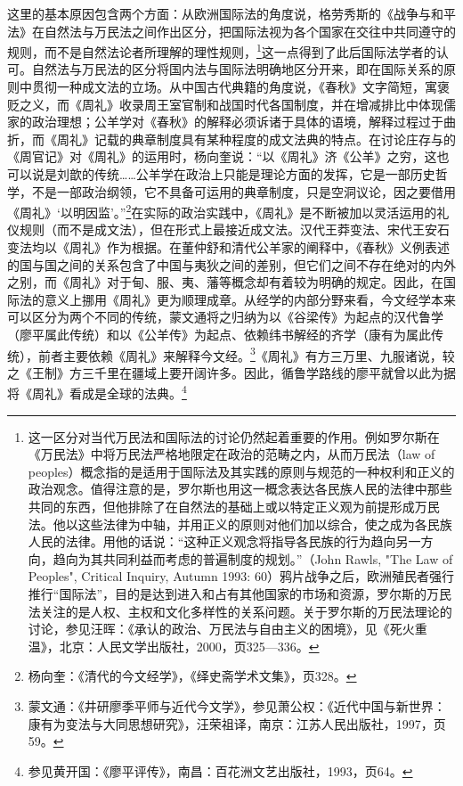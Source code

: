 \documentclass[a4paper, 12pt, openright]{ctexbook}
\begin{document}
这里的基本原因包含两个方面：从欧洲国际法的角度说，格劳秀斯的《战争与和平法》在自然法与万民法之间作出区分，把国际法视为各个国家在交往中共同遵守的规则，而不是自然法论者所理解的理性规则，\footnote{这一区分对当代万民法和国际法的讨论仍然起着重要的作用。例如罗尔斯在《万民法》中将万民法严格地限定在政治的范畴之内，从而万民法（law of peoples）概念指的是适用于国际法及其实践的原则与规范的一种权利和正义的政治观念。值得注意的是，罗尔斯也用这一概念表达各民族人民的法律中那些共同的东西，但他排除了在自然法的基础上或以特定正义观为前提形成万民法。他以这些法律为中轴，并用正义的原则对他们加以综合，使之成为各民族人民的法律。用他的话说：“这种正义观念将指导各民族的行为趋向另一方向，趋向为其共同利益而考虑的普遍制度的规划。”（John Rawls, "The Law of Peoples", Critical Inquiry, Autumn 1993: 60）鸦片战争之后，欧洲殖民者强行推行“国际法”，目的是达到进入和占有其他国家的市场和资源，罗尔斯的万民法关注的是人权、主权和文化多样性的关系问题。关于罗尔斯的万民法理论的讨论，参见汪晖：《承认的政治、万民法与自由主义的困境》，见《死火重温》，北京：人民文学出版社，2000，页325—336。}这一点得到了此后国际法学者的认可。自然法与万民法的区分将国内法与国际法明确地区分开来，即在国际关系的原则中贯彻一种成文法的立场。从中国古代典籍的角度说，《春秋》文字简短，寓褒贬之义，而《周礼》收录周王室官制和战国时代各国制度，并在增减排比中体现儒家的政治理想；公羊学对《春秋》的解释必须诉诸于具体的语境，解释过程过于曲折，而《周礼》记载的典章制度具有某种程度的成文法典的特点。在讨论庄存与的《周官记》对《周礼》的运用时，杨向奎说：“以《周礼》济《公羊》之穷，这也可以说是刘歆的传统……公羊学在政治上只能是理论方面的发挥，它是一部历史哲学，不是一部政治纲领，它不具备可运用的典章制度，只是空洞议论，因之要借用《周礼》‘以明因监’。”\footnote{杨向奎：《清代的今文经学》，《绎史斋学术文集》，页328。}在实际的政治实践中，《周礼》是不断被加以灵活运用的礼仪规则（而不是成文法），但在形式上最接近成文法。汉代王莽变法、宋代王安石变法均以《周礼》作为根据。在董仲舒和清代公羊家的阐释中，《春秋》义例表述的国与国之间的关系包含了中国与夷狄之间的差别，但它们之间不存在绝对的内外之别，而《周礼》对于甸、服、夷、藩等概念却有着较为明确的规定。因此，在国际法的意义上挪用《周礼》更为顺理成章。从经学的内部分野来看，今文经学本来可以区分为两个不同的传统，蒙文通将之归纳为以《谷梁传》为起点的汉代鲁学（廖平属此传统）和以《公羊传》为起点、依赖纬书解经的齐学（康有为属此传统），前者主要依赖《周礼》来解释今文经。\footnote{蒙文通：《井研廖季平师与近代今文学》，参见萧公权：《近代中国与新世界：康有为变法与大同思想研究》，汪荣祖译，南京：江苏人民出版社，1997，页59。}《周礼》有方三万里、九服诸说，较之《王制》方三千里在疆域上要开阔许多。因此，循鲁学路线的廖平就曾以此为据将《周礼》看成是全球的法典。\footnote{参见黄开国：《廖平评传》，南昌：百花洲文艺出版社，1993，页64。}
\end{document}
